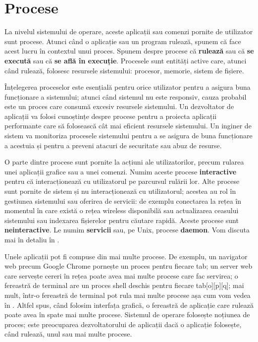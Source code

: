 \chapter{Procese}
\label{chapter:procese}

La nivelul sistemului de operare, aceste aplicații sau comenzi pornite de
utilizator sunt procese. Atunci când o aplicație sau un program rulează, spunem
că face acest lucru în contextul unui proces. Spunem despre procese că
\textbf{rulează} sau că \textbf{se execută} sau că \textbf{se află în execuție}.
Procesele sunt entități active care, atunci când rulează, folosesc resursele
sistemului: procesor, memorie, sistem de fișiere.

Înțelegerea proceselor este esențială pentru orice utilizator pentru a asigura
buna funcționare a sistemului; atunci când sistemul nu este responsiv, cauza
probabil este un proces care consumă excesiv resursele sistemului. Un
dezvoltator de aplicații va folosi cunoștințe despre procese pentru a proiecta
aplicații performante care să folosească cât mai eficient resursele sistemului.
Un inginer de sistem va monitoriza procesele sistemului pentru a se asigura de
buna funcționare a acestuia și pentru a preveni atacuri de securitate sau abuz
de resurse.

O parte dintre procese sunt pornite la acțiuni ale utilizatorilor, precum
rularea unei aplicații grafice sau a unei comenzi. Numim aceste procese
\textbf{interactive} pentru că interacționează cu utilizatorul pe parcursul
rulării lor. Alte procese sunt pornite de sistem și nu interacționează cu
utilizatorul; acestea au rol în gestiunea sistemului sau oferirea de servicii:
de exemplu conectarea la rețea în momentul în care există o rețea wireless
disponibilă sau actualizarea ceasului sistemului sau indexarea fișierelor pentru
căutare rapidă. Aceste procese sunt \textbf{neinteractive}. Le numim
\textbf{servicii} sau, pe Unix, procese \textbf{daemon}. Vom discuta mai în
detaliu în .

Unele aplicații pot fi compuse din mai multe procese. De exemplu, un navigator
web precum Google Chrome pornește un proces pentru fiecare tab; un server web
care servește cereri în rețea poate avea mai multe procese care fac servirea; o
fereastră de terminal are un proces shell deschis pentru fiecare tab[o][p][q];
mai mult, într-o fereastră de terminal pot rula mai multe procese așa cum vom
vedea în .
Altfel spus, când folosim interfața grafică, o fereastră de aplicație care
rulează poate avea în spate mai multe procese. Sistemul de operare folosește
noțiunea de proces; este preocuparea dezvoltatorului de aplicații dacă o
aplicație folosește, când rulează, unul sau mai multe procese.

